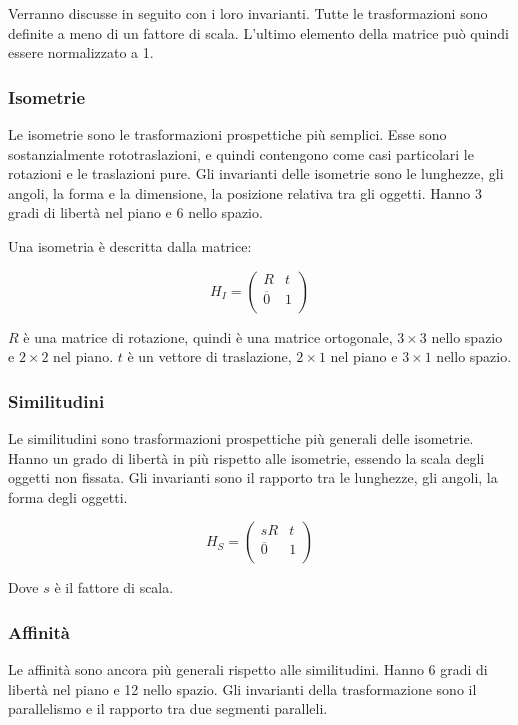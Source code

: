 Verranno discusse in seguito con i loro invarianti.
Tutte le trasformazioni sono definite a meno di un fattore di scala. L'ultimo elemento della matrice può quindi essere normalizzato a 1.

\subsubsection{Isometrie}

Le isometrie sono le trasformazioni prospettiche più semplici. Esse sono sostanzialmente rototraslazioni, e quindi contengono come casi particolari le rotazioni e le traslazioni pure. Gli invarianti delle isometrie sono le lunghezze, gli angoli, la forma e la dimensione, la posizione relativa tra gli oggetti. Hanno 3 gradi di libertà nel piano e 6 nello spazio.

Una isometria è descritta dalla matrice:

\begin{equation*}
  H_I = \begin{pmatrix}
   R & t \\
   \overline{0} & 1 \\
  \end{pmatrix}
\end{equation*}

$R$ è una matrice di rotazione, quindi è una matrice ortogonale, $3\times 3$ nello spazio e $2\times 2$ nel piano.
$t$ è un vettore di traslazione, $2\times 1$ nel piano e $3\times 1$ nello spazio.

\subsubsection{Similitudini}
Le similitudini sono trasformazioni prospettiche più generali delle isometrie. Hanno un grado di libertà in più rispetto alle isometrie, essendo la scala degli oggetti non fissata. Gli invarianti sono il rapporto tra le lunghezze, gli angoli, la forma degli oggetti.

\begin{equation*}
  H_S = \begin{pmatrix}
   sR & t \\
   \overline{0} & 1 \\
  \end{pmatrix}
\end{equation*}

Dove $s$ è il fattore di scala.

\subsubsection{Affinità}
Le affinità sono ancora più generali rispetto alle similitudini. Hanno 6 gradi di libertà nel piano e 12 nello spazio. Gli invarianti della trasformazione sono il parallelismo e il rapporto tra due segmenti paralleli.

